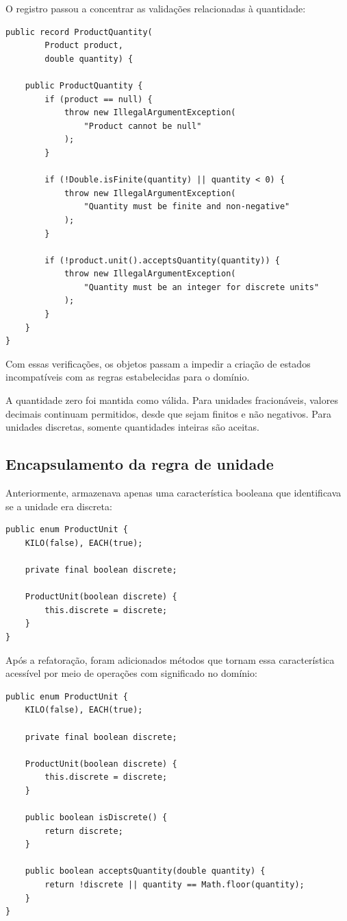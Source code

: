 O registro  passou a concentrar as validações relacionadas à quantidade:

\begin{lstlisting}
public record ProductQuantity(
        Product product,
        double quantity) {

    public ProductQuantity {
        if (product == null) {
            throw new IllegalArgumentException(
                "Product cannot be null"
            );
        }

        if (!Double.isFinite(quantity) || quantity < 0) {
            throw new IllegalArgumentException(
                "Quantity must be finite and non-negative"
            );
        }

        if (!product.unit().acceptsQuantity(quantity)) {
            throw new IllegalArgumentException(
                "Quantity must be an integer for discrete units"
            );
        }
    }
}
\end{lstlisting}

Com essas verificações, os objetos passam a impedir a criação de estados incompatíveis com as regras estabelecidas para o domínio.

A quantidade zero foi mantida como válida. Para unidades fracionáveis, valores decimais continuam permitidos, desde que sejam finitos e não negativos. Para unidades discretas, somente quantidades inteiras são aceitas.

\subsection{Encapsulamento da regra de unidade}

Anteriormente,  armazenava apenas uma característica booleana que identificava se a unidade era discreta:

\begin{lstlisting}
public enum ProductUnit {
    KILO(false), EACH(true);

    private final boolean discrete;

    ProductUnit(boolean discrete) {
        this.discrete = discrete;
    }
}
\end{lstlisting}

Após a refatoração, foram adicionados métodos que tornam essa característica acessível por meio de operações com significado no domínio:

\begin{lstlisting}
public enum ProductUnit {
    KILO(false), EACH(true);

    private final boolean discrete;

    ProductUnit(boolean discrete) {
        this.discrete = discrete;
    }

    public boolean isDiscrete() {
        return discrete;
    }

    public boolean acceptsQuantity(double quantity) {
        return !discrete || quantity == Math.floor(quantity);
    }
}
\end{lstlisting}

